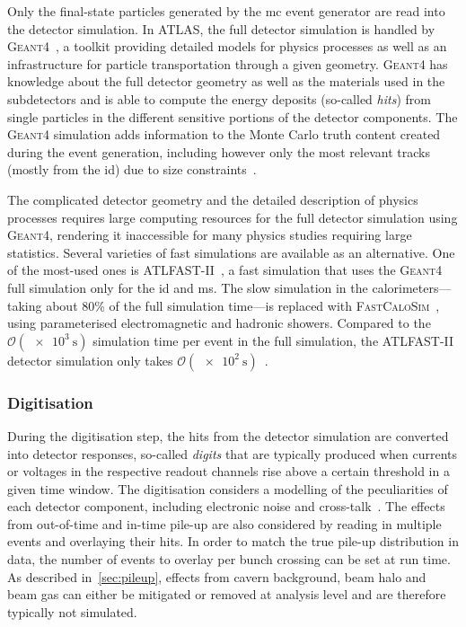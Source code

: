 Only the final-state particles generated by the \gls{mc} event generator are read into the detector simulation. In ATLAS, the full detector simulation is handled by \textsc{Geant4}~\cite{geant:2002hh}, a toolkit providing detailed models for physics processes as well as an infrastructure for particle transportation through a given geometry. \textsc{Geant4} has knowledge about the full detector geometry as well as the materials used in the subdetectors and is able to compute the energy deposits (so-called \textit{hits}) from single particles in the different sensitive portions of the detector components. The \textsc{Geant4} simulation adds information to the Monte Carlo truth content created during the event generation, including however only the most relevant tracks (mostly from the \gls{id}) due to size constraints~\cite{Aad:2010ah}.

The complicated detector geometry and the detailed description of physics processes requires large computing resources for the full detector simulation using \textsc{Geant4}, rendering it inaccessible for many physics studies requiring large statistics. Several varieties of fast simulations are available as an alternative. One of the most-used ones is \textsc{ATLFAST-II}~\cite{Aad:2010ah}, a fast simulation that uses the \textsc{Geant4} full simulation only for the \gls{id} and \gls{ms}. The slow simulation in the calorimeters---taking about 80\% of the full simulation time---is replaced with \textsc{FastCaloSim}~\cite{ATL-SOFT-PUB-2018-002}, using parameterised electromagnetic and hadronic showers. Compared to the $\mathcal{O}(\SI{e3}{\second})$ simulation time per event in the full simulation, the \textsc{ATLFAST-II} detector simulation only takes $\mathcal{O}(\SI{e2}{\second})$~\cite{Aad:2010ah}. 

\subsubsection{Digitisation}

During the digitisation step, the hits from the detector simulation are converted into detector responses, so-called \textit{digits} that are typically produced when currents or voltages in the respective readout channels rise above a certain threshold in a given time window. The digitisation considers a modelling of the peculiarities of each detector component, including electronic noise and cross-talk~\cite{Aad:2010ah}. The effects from out-of-time and in-time pile-up are also considered by reading in multiple events and overlaying their hits. In order to match the true pile-up distribution in data, the number of events to overlay per bunch crossing can be set at run time. As described in~\cref{sec:pileup}, effects from cavern background, beam halo and beam gas can either be mitigated or removed at analysis level and are therefore typically not simulated. 


